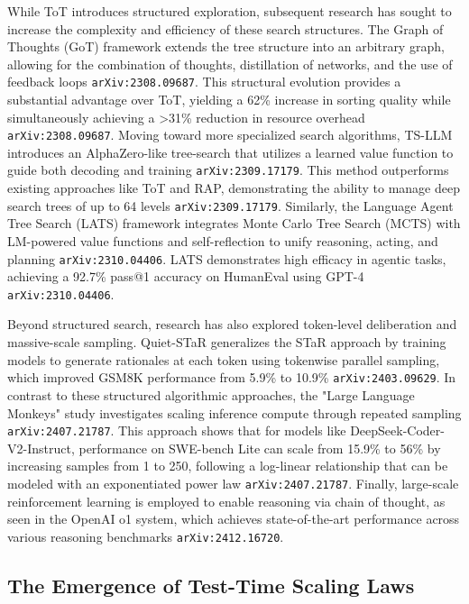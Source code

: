 \documentclass[11pt]{article}
\begin{document}
While ToT introduces structured exploration, subsequent research has sought to increase the complexity and efficiency of these search structures. The Graph of Thoughts (GoT) framework extends the tree structure into an arbitrary graph, allowing for the combination of thoughts, distillation of networks, and the use of feedback loops \texttt{arXiv:2308.09687}. This structural evolution provides a substantial advantage over ToT, yielding a 62\% increase in sorting quality while simultaneously achieving a >31\% reduction in resource overhead \texttt{arXiv:2308.09687}. Moving toward more specialized search algorithms, TS-LLM introduces an AlphaZero-like tree-search that utilizes a learned value function to guide both decoding and training \texttt{arXiv:2309.17179}. This method outperforms existing approaches like ToT and RAP, demonstrating the ability to manage deep search trees of up to 64 levels \texttt{arXiv:2309.17179}. Similarly, the Language Agent Tree Search (LATS) framework integrates Monte Carlo Tree Search (MCTS) with LM-powered value functions and self-reflection to unify reasoning, acting, and planning \texttt{arXiv:2310.04406}. LATS demonstrates high efficacy in agentic tasks, achieving a 92.7\% pass@1 accuracy on HumanEval using GPT-4 \texttt{arXiv:2310.04406}.

Beyond structured search, research has also explored token-level deliberation and massive-scale sampling. Quiet-STaR generalizes the STaR approach by training models to generate rationales at each token using tokenwise parallel sampling, which improved GSM8K performance from 5.9\% to 10.9\% \texttt{arXiv:2403.09629}. In contrast to these structured algorithmic approaches, the "Large Language Monkeys" study investigates scaling inference compute through repeated sampling \texttt{arXiv:2407.21787}. This approach shows that for models like DeepSeek-Coder-V2-Instruct, performance on SWE-bench Lite can scale from 15.9\% to 56\% by increasing samples from 1 to 250, following a log-linear relationship that can be modeled with an exponentiated power law \texttt{arXiv:2407.21787}. Finally, large-scale reinforcement learning is employed to enable reasoning via chain of thought, as seen in the OpenAI o1 system, which achieves state-of-the-art performance across various reasoning benchmarks \texttt{arXiv:2412.16720}.

\subsection{The Emergence of Test-Time Scaling Laws}
\end{document}
